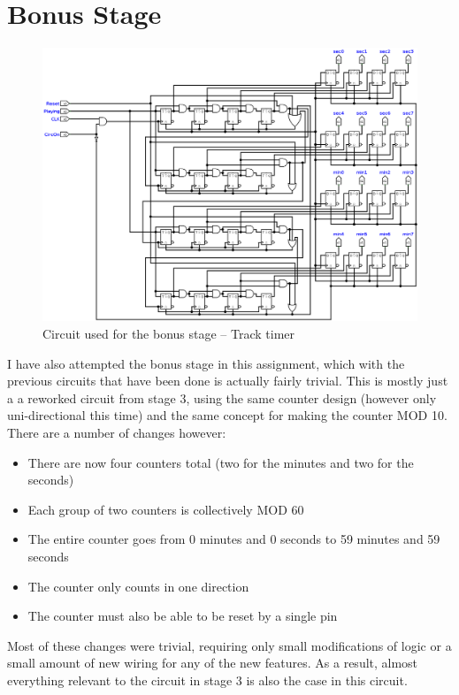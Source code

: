 \documentclass[11pt]{scrartcl}
\begin{document}
\pagebreak

\section*{Bonus Stage}
\begin{figure}[h]
    \centering
    \includegraphics[scale=0.25]{images/bonusstage.png}
    \caption{Circuit used for the bonus stage -- Track timer}
\end{figure}
I have also attempted the bonus stage in this assignment, which with the previous circuits
that have been done is actually fairly trivial. This is mostly just a a reworked circuit
from stage 3, using the same counter design (however only uni-directional this time)
and the same concept for making the counter MOD 10. There are a number of changes however:
\begin{itemize}
    \item There are now four counters total (two for the minutes and two for the seconds)
    \item Each group of two counters is collectively MOD 60
    \item The entire counter goes from 0 minutes and 0 seconds to 59 minutes and 59 seconds
    \item The counter only counts in one direction
    \item The counter must also be able to be reset by a single pin
\end{itemize}
Most of these changes were trivial, requiring only small modifications of logic or a small
amount of new wiring for any of the new features. As a result, almost everything relevant
to the circuit in stage 3 is also the case in this circuit.
\end{document}
